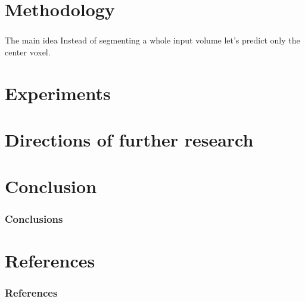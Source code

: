 \documentclass{beamer}
\begin{document}
\section{Methodology}

\begin{frame}
    \frametitle{}
    \begin{block}{The main idea}
        Instead of segmenting a whole input volume let's predict only the center voxel.
    \end{block}
\end{frame}

\section{Experiments}

\section{Directions of further research}

\section*{Conclusion}

\begin{frame}
    \frametitle{Conclusions}
\end{frame}

\section*{References}

\begin{frame}[allowframebreaks]
    \frametitle{References}

    
    
\end{frame}
\end{document}
